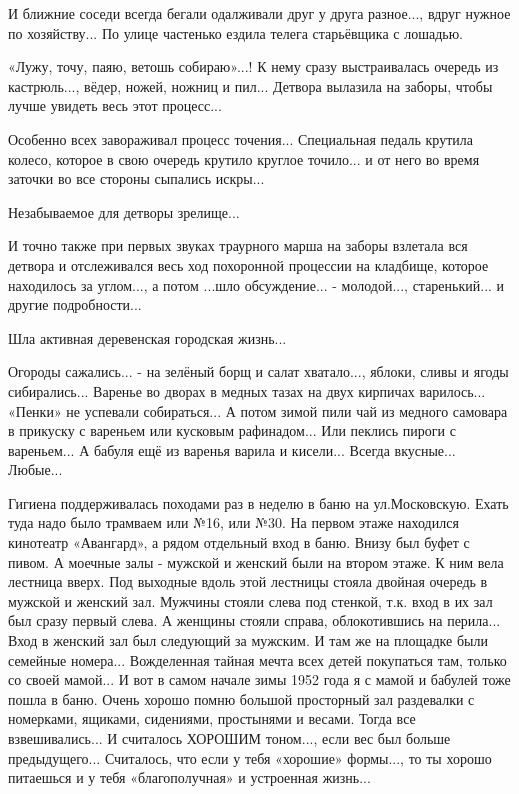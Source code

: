 И ближние соседи всегда бегали одалживали друг у друга разное..., вдруг нужное
по хозяйству... По улице частенько ездила телега старьёвщика с лошадью. 

«Лужу, точу, паяю, ветошь собираю»...! К нему сразу выстраивалась очередь из
кастрюль..., вёдер, ножей, ножниц и пил... Детвора вылазила на заборы, чтобы лучше
увидеть весь этот процесс...

Особенно всех завораживал процесс точения... Специальная педаль крутила колесо,
которое в свою очередь крутило круглое точило... и от него во время заточки во
все стороны сыпались искры... 

Незабываемое для детворы зрелище... 

И точно также при первых звуках траурного марша на заборы взлетала вся детвора
и отслеживался весь ход похоронной процессии на кладбище, которое находилось за
углом..., а потом ...шло обсуждение... - молодой..., старенький... и другие
подробности... 

Шла активная деревенская городская жизнь...

Огороды сажались... - на зелёный борщ и салат хватало..., яблоки, сливы и ягоды
сибирались... Варенье во дворах в медных тазах на двух кирпичах варилось... «Пенки»
не успевали собираться... А потом зимой пили чай из медного самовара в прикуску с
вареньем или кусковым рафинадом... Или пеклись пироги с вареньем... А бабуля
ещё из варенья варила и кисели... Всегда вкусные... Любые...

Гигиена поддерживалась походами раз в неделю в баню на ул.Московскую. Ехать
туда надо было трамваем или №16, или №30. На первом этаже находился кинотеатр
«Авангард», а рядом отдельный вход в баню. Внизу был буфет с пивом. А моечные
залы - мужской и женский были на втором этаже. К ним вела лестница вверх. Под
выходные вдоль этой лестницы стояла двойная очередь в мужской и женский зал.
Мужчины стояли слева под стенкой, т.к. вход в их зал был сразу первый слева. А
женщины стояли справа, облокотившись на перила... Вход в женский зал был
следующий за мужским. И там же на площадке были семейные номера... Вожделенная
тайная мечта всех детей покупаться там, только со своей мамой... И вот в самом
начале зимы 1952 года я с мамой и бабулей тоже пошла в баню. Очень хорошо помню
большой просторный зал раздевалки с номерками, ящиками, сидениями, простынями и
весами. Тогда все взвешивались... И считалось ХОРОШИМ тоном..., если вес был больше
предыдущего... Считалось, что если у тебя «хорошие» формы..., то ты хорошо
питаешься и у тебя «благополучная» и устроенная жизнь... 

